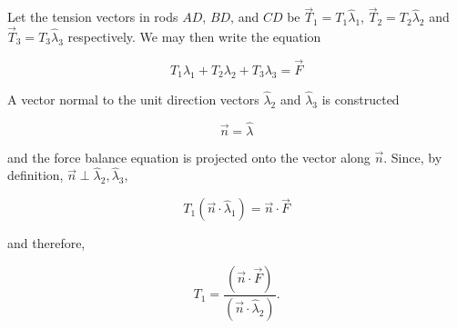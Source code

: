 Let the tension vectors in rods $AD$, $BD$, and $CD$ be $\vec{T}_1 = T_1 \hat\lambda_1$, $\vec{T}_2 = T_2 \hat\lambda_2$ and $\vec{T}_3 = T_3 \hat\lambda_3$ respectively. We may then write the equation

\begin{equation}
    T_1 \lambda_1 + T_2 \lambda_2 + T_3 \lambda_3 = \vec{F}
\end{equation}

A vector normal to the unit direction vectors $\hat\lambda_2$ and $\hat\lambda_3$ is constructed

\begin{equation}
    \vec{n} = \hat\lambda
\end{equation}

and the force balance equation is projected onto the vector along $\vec{n}$. Since, by definition, $\vec{n} \perp \hat\lambda_2, \hat\lambda_3$,

\begin{equation}
    T_1 \left(\vec{n} \cdot \hat\lambda_1 \right) = \vec{n} \cdot \vec{F}
\end{equation}

and therefore,

\begin{equation}
    T_1 = \frac{\left(\vec{n} \cdot \vec{F}\right)}{\left(\vec{n} \cdot \hat\lambda_2\right)}.
\end{equation}

